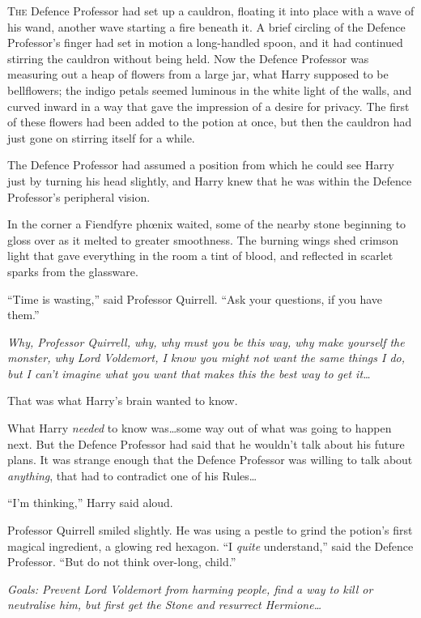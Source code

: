 
\lettrine{T}{he} Defence Professor had set up a cauldron, floating it into place with a wave of his wand, another wave starting a fire beneath it. A brief circling of the Defence Professor’s finger had set in motion a long-handled spoon, and it had continued stirring the cauldron without being held. Now the Defence Professor was measuring out a heap of flowers from a large jar, what Harry supposed to be bellflowers; the indigo petals seemed luminous in the white light of the walls, and curved inward in a way that gave the impression of a desire for privacy. The first of these flowers had been added to the potion at once, but then the cauldron had just gone on stirring itself for a while.

The Defence Professor had assumed a position from which he could see Harry just by turning his head slightly, and Harry knew that he was within the Defence Professor’s peripheral vision.

In the corner a Fiendfyre phœnix waited, some of the nearby stone beginning to gloss over as it melted to greater smoothness. The burning wings shed crimson light that gave everything in the room a tint of blood, and reflected in scarlet sparks from the glassware.

“Time is wasting,” said Professor Quirrell. “Ask your questions, if you have them.”

\emph{Why, Professor Quirrell, why, why must you be this way, why make yourself the monster, why Lord Voldemort, I know you might not want the same things I do, but I can’t imagine what you want that makes \emph{this} the best way to get it…}

That was what Harry’s brain wanted to know.

What Harry \emph{needed} to know was…some way out of what was going to happen next. But the Defence Professor had said that he wouldn’t talk about his future plans. It was strange enough that the Defence Professor was willing to talk about \emph{anything}, that had to contradict one of his Rules…

“I’m thinking,” Harry said aloud.

Professor Quirrell smiled slightly. He was using a pestle to grind the potion’s first magical ingredient, a glowing red hexagon. “I \emph{quite} understand,” said the Defence Professor. “But do not think over-long, child.”

\emph{Goals: Prevent Lord Voldemort from harming people, find a way to kill or neutralise him, but first get the Stone and resurrect Hermione…}

